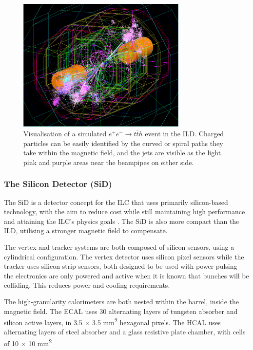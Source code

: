 \begin{figure}[h]
	\centering
	\includegraphics[width=0.75\textwidth]{../Pictures/SimulatedEvent1.png}
	\caption{Visualisation of a simulated $e^+ e^- \rightarrow t \overline{t} h$ event in the \acrshort{ILD}. Charged particles can be easily identified by the curved or spiral paths they take within the magnetic field, and the jets are visible as the light pink and purple areas near the beampipes on either side.}
	\label{figure:colliders/ILD/tth-simulation}
\end{figure}

\subsubsection{The Silicon Detector (SiD)}
The \acrfull{SiD} is a detector concept for the \acrshort{ILC} that uses primarily silicon-based technology, with the aim to reduce cost while still maintaining high performance and attaining the \acrshort{ILC}'s physics goals \cite{ilc-tdr-detectors}. The \acrshort{SiD} is also more compact than the \acrshort{ILD}, utilising a stronger magnetic field to compensate.

The vertex and tracker systems are both composed of silicon sensors, using a cylindrical configuration. The vertex detector uses silicon pixel sensors while the tracker uses silicon strip sensors, both designed to be used with power pulsing -- the electronics are only powered and active when it is known that bunches will be colliding. This reduces power and cooling requirements. 

The high-granularity calorimeters are both nested within the barrel, inside the magnetic field. The \acrshort{ECAL} uses 30 alternating layers of tungsten absorber and silicon active layers, in 3.5 $\times$ 3.5 mm\textsuperscript{2} hexagonal pixels. The \acrshort{HCAL} uses alternating layers of steel absorber and a glass resistive plate chamber, with cells of 10 $\times$ 10 mm\textsuperscript{2}

